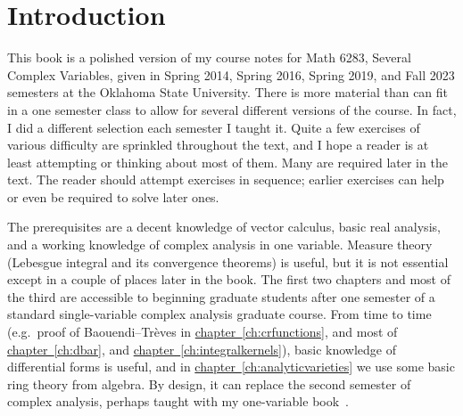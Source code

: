 \documentclass[12pt,openany]{book}
\theoremstyle{plain}
\theoremstyle{remark}
\theoremstyle{definition}
\theoremstyle{exercise}
\theoremstyle{example}
\newcommand{\chapterref}[1]{\hyperref[#1]{chapter~\ref*{#1}}}
\begin{document}

\tableofcontents
{}



\chapter*{Introduction} \label{ch:intro}


This book is a polished version of my course notes for Math 6283, Several
Complex Variables, given in
Spring 2014, Spring 2016, Spring 2019, and Fall 2023 semesters
at the Oklahoma State University.
There is more material than can fit in a one semester class
to allow for several different versions of the course.
In fact, I did a different selection each semester I taught it.
Quite a few exercises of various difficulty are
sprinkled throughout the text, and I hope a reader is
at least attempting or thinking about most of them.
Many are required later in the text.
The reader should attempt exercises in sequence; earlier exercises
can help or even be required to solve later ones.

The prerequisites are a decent knowledge of vector calculus, basic
real analysis, and a working knowledge of complex analysis in one variable.
Measure theory (Lebesgue integral and its convergence theorems) is useful,
but it is not essential except in a couple of places later in the book.
The first two chapters and most of the third
are accessible to beginning graduate students after one semester
of a standard single-variable complex
analysis graduate course.
From time to time (e.g.\ proof of Baouendi--Tr\`eves in
\chapterref{ch:crfunctions},
and most of
\chapterref{ch:dbar}, and \chapterref{ch:integralkernels}),
basic knowledge of differential forms is useful, and
in \chapterref{ch:analyticvarieties}
we use some basic ring theory from algebra.
By design, it can replace the second semester of complex analysis,
perhaps taught with my one-variable book~\cite{Lebl:ca}.
\end{document}
